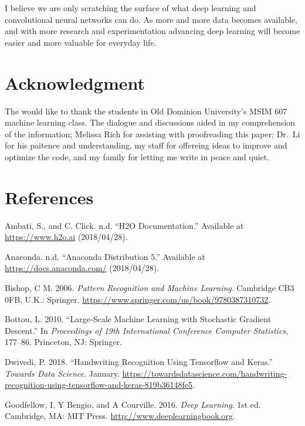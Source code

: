 \documentclass[conference,final,]{IEEEtran}
\begin{document}
I believe we are only scratching the surface of what deep learning and
convolutional neural networks can do. As more and more data becomes
available, and with more research and experimentation advancing deep
learning will become easier and more valuable for everyday life.

\section{Acknowledgment}\label{acknowledgment}

The would like to thank the students in Old Dominion University's MSIM
607 machine learning class. The dialogue and discussions aided in my
comprehension of the information; Melissa Rich for assisting with
proofreading this paper; Dr.~Li for his paitence and understanding, my
staff for offereing ideas to improve and optimize the code, and my
family for letting me write in peace and quiet.

\newpage

\section*{References}\label{references}

\hypertarget{refs}{}
\hypertarget{ref-h2o}{}
Ambati, S., and C. Click. n.d. ``H2O Documentation.'' Available at
\url{https://www.h2o.ai} (2018/04/28).

\hypertarget{ref-py3}{}
Anaconda. n.d. ``Anaconda Distribution 5.'' Available at
\url{https://docs.anaconda.com/} (2018/04/28).

\hypertarget{ref-bishop2006}{}
Bishop, C M. 2006. \emph{Pattern Recognition and Machine Learning}.
Cambridge CB3 0FB, U.K.: Springer.
\url{https://www.springer.com/us/book/9780387310732}.

\hypertarget{ref-sgd2010}{}
Bottou, L. 2010. ``Large-Scale Machine Learning with Stochastic Gradient
Descent.'' In \emph{Proceedings of 19th International Conference
Computer Statistics}, 177--86. Princeton, NJ: Springer.

\hypertarget{ref-dwivedi2018}{}
Dwivedi, P. 2018. ``Handwriting Recognition Using Tensorflow and
Keras.'' \emph{Towards Data Science}. January.
\url{https://towardsdatascience.com/handwriting-recognition-using-tensorflow-and-keras-819b36148fe5}.

\hypertarget{ref-goodfellow2016}{}
Goodfellow, I, Y Bengio, and A Courville. 2016. \emph{Deep Learning}.
1st ed. Cambridge, MA: MIT Press. \url{http://www.deeplearningbook.org}.
\end{document}
